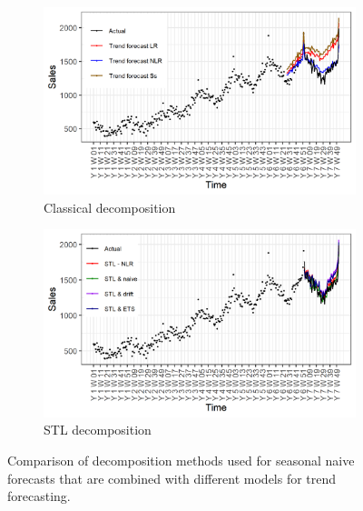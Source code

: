 \documentclass[12pt, letterpaper]{article}\usepackage[]{graphicx}\usepackage[]{color}
\begin{document}
\begin{figure}[h!]
\centering
\begin{subfigure}{0.9\textwidth}
\includegraphics[width = \textwidth]{"figures/cl_decomposition.png"}
\caption{Classical decomposition}
\label{fig:cl_decomposition}
\end{subfigure}
\hfill
\begin{subfigure}{0.9\textwidth}
\includegraphics[width = \textwidth]{"figures/stl_decomposition.png"}
\caption{STL decomposition}
\label{fig:stl_decomposition}
\end{subfigure}
\caption{Comparison of decomposition methods used for seasonal naive forecasts that are combined with different models for trend forecasting.}
\label{fig:decomposition_models}
\end{figure}
\end{document}

